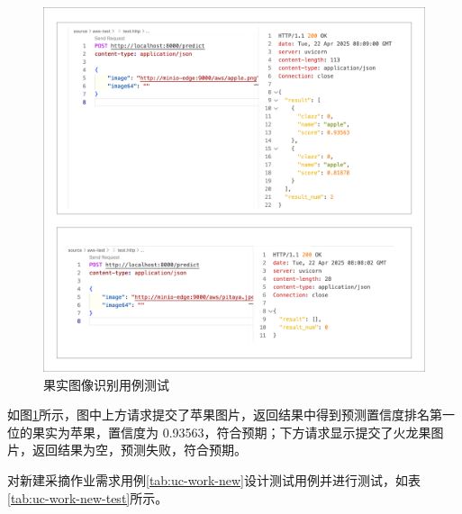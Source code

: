 \begin{figure}[H]
    \centering
    \includegraphics[width=0.9\linewidth]{../result/produce-predict.png}
    \caption{果实图像识别用例测试}
    \label{fig:produce-predict}
\end{figure}

如图\ref{fig:produce-predict}所示，图中上方请求提交了苹果图片，返回结果中得到预测置信度排名第一位的果实为苹果，置信度为 0.93563，符合预期；下方请求显示提交了火龙果图片，返回结果为空，预测失败，符合预期。

对新建采摘作业需求用例\ref{tab:uc-work-new}设计测试用例并进行测试，如表\ref{tab:uc-work-new-test}所示。

